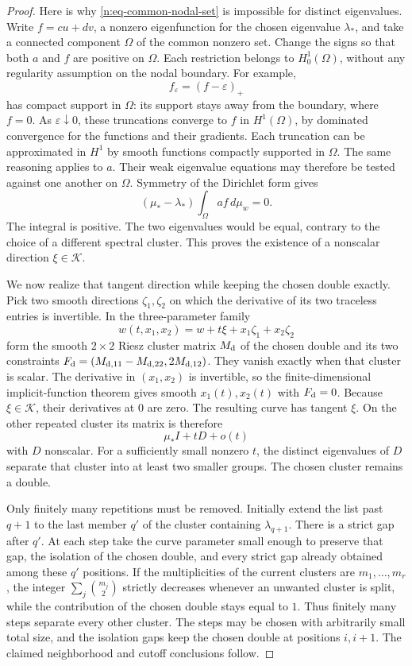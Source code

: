 \begin{proof}
Here is why \eqref{n:eq-common-nodal-set} is impossible for distinct
eigenvalues.  Write \(f=cu+dv\), a nonzero eigenfunction for the
chosen eigenvalue \(\lambda_*\), and take a connected component
\(\Omega\) of the common nonzero set.  Change the signs so that both
\(a\) and \(f\) are positive on \(\Omega\).  Each restriction belongs
to \(H^1_0(\Omega)\), without any regularity assumption on the nodal
boundary.  For example,
\[
 f_\varepsilon=(f-\varepsilon)_+
\]
has compact support in \(\Omega\): its support stays away from the
boundary, where \(f=0\).  As \(\varepsilon\downarrow0\), these
truncations converge to \(f\) in \(H^1(\Omega)\), by dominated
convergence for the functions and their gradients.  Each truncation
can be approximated in \(H^1\) by smooth functions compactly
supported in \(\Omega\).  The same reasoning applies to \(a\).
Their weak eigenvalue equations may therefore be tested against one
another on \(\Omega\).  Symmetry of the Dirichlet form gives
\[
 (\mu_*-\lambda_*)\int_\Omega af\,d\mu_w=0.
\]
The integral is positive.  The two eigenvalues would be equal,
contrary to the choice of a different spectral cluster.  This proves
the existence of a nonscalar direction \(\xi\in\mathcal K\).

We now realize that tangent direction while keeping the chosen double
exactly.  Pick two smooth directions \(\zeta_1,\zeta_2\) on which
the derivative of its two traceless entries is invertible.  In the
three-parameter family
\[
 w(t,x_1,x_2)=w+t\xi+x_1\zeta_1+x_2\zeta_2
\]
form the smooth \(2\times2\) Riesz cluster matrix \(M_{\rm d}\) of
the chosen double and its two constraints
\(F_{\rm d}=(M_{{\rm d},11}-M_{{\rm d},22},2M_{{\rm d},12})\).
They vanish exactly when that cluster is scalar.  The derivative
in \((x_1,x_2)\) is invertible, so the finite-dimensional
implicit-function theorem gives smooth \(x_1(t),x_2(t)\) with
\(F_{\rm d}=0\).  Because \(\xi\in\mathcal K\), their derivatives
at \(0\) are zero.  The resulting curve has tangent \(\xi\).
On the other repeated cluster its matrix is therefore
\[
 \mu_* I+tD+o(t)
\]
with \(D\) nonscalar.  For a sufficiently small nonzero \(t\),
the distinct eigenvalues of \(D\) separate that cluster into at
least two smaller groups.  The chosen cluster remains a double.

Only finitely many repetitions must be removed.  Initially extend
the list past \(q+1\) to the last member \(q'\) of the cluster
containing \(\lambda_{q+1}\).  There is a strict gap after \(q'\).
At each step take the curve parameter small enough to preserve that
gap, the isolation of the chosen double, and every strict gap already
obtained among these \(q'\) positions.  If the multiplicities of
the current clusters are \(m_1,\ldots,m_r\), the integer
\(\sum_j\binom{m_j}{2}\) strictly decreases whenever an unwanted
cluster is split, while the contribution of the chosen double stays
equal to \(1\).  Thus finitely many steps separate every other
cluster.  The steps may be chosen with arbitrarily small total size,
and the isolation gaps keep the chosen double at positions \(i,i+1\).
The claimed neighborhood and cutoff conclusions follow.
\end{proof}

